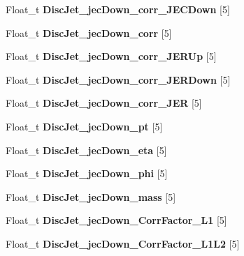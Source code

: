 \begin{DoxyCompactItemize}
Float\+\_\+t {\bfseries Disc\+Jet\+\_\+jec\+Down\+\_\+corr\+\_\+\+J\+E\+C\+Down} \mbox{[}5\mbox{]}
\item 
\hypertarget{classMiniTree_af20a40befe27fe4292ad0e1bb6ac6ad3}{}\label{classMiniTree_af20a40befe27fe4292ad0e1bb6ac6ad3} 
Float\+\_\+t {\bfseries Disc\+Jet\+\_\+jec\+Down\+\_\+corr} \mbox{[}5\mbox{]}
\item 
\hypertarget{classMiniTree_ae214b7fc9a54f1f439cea9abd87bd160}{}\label{classMiniTree_ae214b7fc9a54f1f439cea9abd87bd160} 
Float\+\_\+t {\bfseries Disc\+Jet\+\_\+jec\+Down\+\_\+corr\+\_\+\+J\+E\+R\+Up} \mbox{[}5\mbox{]}
\item 
\hypertarget{classMiniTree_abe02e583f97ba96eeed6ea9c0c30719e}{}\label{classMiniTree_abe02e583f97ba96eeed6ea9c0c30719e} 
Float\+\_\+t {\bfseries Disc\+Jet\+\_\+jec\+Down\+\_\+corr\+\_\+\+J\+E\+R\+Down} \mbox{[}5\mbox{]}
\item 
\hypertarget{classMiniTree_a3395124d9ccf92bc75c760e6090cb17c}{}\label{classMiniTree_a3395124d9ccf92bc75c760e6090cb17c} 
Float\+\_\+t {\bfseries Disc\+Jet\+\_\+jec\+Down\+\_\+corr\+\_\+\+J\+ER} \mbox{[}5\mbox{]}
\item 
\hypertarget{classMiniTree_a52f1f755d5aa5336160e007d617f2340}{}\label{classMiniTree_a52f1f755d5aa5336160e007d617f2340} 
Float\+\_\+t {\bfseries Disc\+Jet\+\_\+jec\+Down\+\_\+pt} \mbox{[}5\mbox{]}
\item 
\hypertarget{classMiniTree_af7fe9abf3a4d3cc859682f4f43596d2e}{}\label{classMiniTree_af7fe9abf3a4d3cc859682f4f43596d2e} 
Float\+\_\+t {\bfseries Disc\+Jet\+\_\+jec\+Down\+\_\+eta} \mbox{[}5\mbox{]}
\item 
\hypertarget{classMiniTree_acb2714c6a80f66c04f1e7f2e1880abae}{}\label{classMiniTree_acb2714c6a80f66c04f1e7f2e1880abae} 
Float\+\_\+t {\bfseries Disc\+Jet\+\_\+jec\+Down\+\_\+phi} \mbox{[}5\mbox{]}
\item 
\hypertarget{classMiniTree_a7a0ca9437bd0235061975f847742300f}{}\label{classMiniTree_a7a0ca9437bd0235061975f847742300f} 
Float\+\_\+t {\bfseries Disc\+Jet\+\_\+jec\+Down\+\_\+mass} \mbox{[}5\mbox{]}
\item 
\hypertarget{classMiniTree_a9406b4d0e157bd62c2adee0817606d50}{}\label{classMiniTree_a9406b4d0e157bd62c2adee0817606d50} 
Float\+\_\+t {\bfseries Disc\+Jet\+\_\+jec\+Down\+\_\+\+Corr\+Factor\+\_\+\+L1} \mbox{[}5\mbox{]}
\item 
\hypertarget{classMiniTree_a62a86a550a9e3f6813954cbdc82bb9d4}{}\label{classMiniTree_a62a86a550a9e3f6813954cbdc82bb9d4} 
Float\+\_\+t {\bfseries Disc\+Jet\+\_\+jec\+Down\+\_\+\+Corr\+Factor\+\_\+\+L1\+L2} \mbox{[}5\mbox{]}

\end{DoxyCompactItemize}
